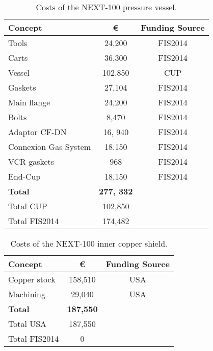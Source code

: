 \begin{table}[h!]
\begin{center}
\begin{tabular}{|l|c|c|}
\hline
 Concept & \euro & Funding Source \\
 \hline
Tools &	24,200 & FIS2014 \\
Carts &	 36,300 & FIS2014 \\
Vessel	& 102.850 & CUP \\
Gaskets 	& 27,104 & FIS2014 \\
Main flange &	24,200 & FIS2014 \\
Bolts & 8,470 & FIS2014 \\
Adaptor CF-DN	 &	16, 940 & FIS2014 \\
Connexion Gas System	& 18.150 & FIS2014 \\ 
VCR gaskets	& 968 & FIS2014 \\ 
End-Cup & 18,150 & FIS2014 \\ 
\hline
{\bf Total}	& {\bf277, 332 } & \\	
Total CUP	& 102,850 & \\	
Total FIS2014	& 174,482 & \\	
 \hline\hline
\end{tabular}  
\caption{Costs of the NEXT-100 pressure vessel.}
\label{tab.n100:PV}
\end{center}
\end{table} 

\begin{table}[h!]
\begin{center}
\begin{tabular}{|l|c|c|}
\hline
 Concept & \euro & Funding Source \\
 \hline
 Copper stock &	158,510 &	USA \\
Machining & 29,040 &	USA \\
 \hline
{\bf Total} &	{\bf 187,550} & \\		
Total USA	& 187,550 & \\
Total FIS2014	& 0 & \\	
 \hline\hline
\end{tabular}  
\caption{Costs of the NEXT-100 inner copper shield.}
\label{tab.n100:ICS}
\end{center}
\end{table} 

